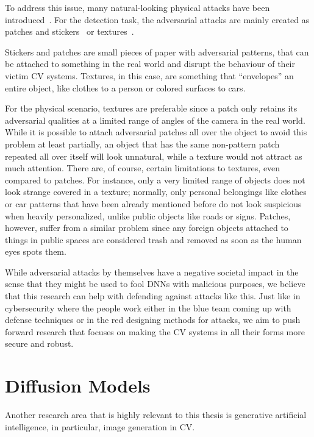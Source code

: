 To address this issue, many natural-looking physical attacks have been introduced~\cite{stop_signs_detectors_380, dog_patch_clothes, wang2021dual}.
For the detection task, the adversarial attacks are mainly created as patches and stickers~\cite{spatial_context, aerial_patch, rp2} or textures~\cite{car_camo, texture}.

Stickers and patches are small pieces of paper with adversarial patterns, that can be attached to something in the real world and disrupt the behaviour of their victim CV systems.
Textures, in this case, are something that ``envelopes'' an entire object, like clothes to a person or colored surfaces to cars.

For the physical scenario, textures are preferable since a patch only retains its adversarial qualities at a limited range of angles of the camera in the real world.
While it is possible to attach adversarial patches all over the object to avoid this problem at least partially, an object that has the same non-pattern patch repeated all over itself will look unnatural, while a texture would not attract as much attention.
There are, of course, certain limitations to textures, even compared to patches.
For instance, only a very limited range of objects does not look strange covered in a texture; normally, only personal belongings like clothes or car patterns that have been already mentioned before do not look suspicious when heavily personalized, unlike public objects like roads or signs.
Patches, however, suffer from a similar problem since any foreign objects attached to things in public spaces are considered trash and removed as soon as the human eyes spots them.

While adversarial attacks by themselves have a negative societal impact in the sense that they might be used to fool DNNs with malicious purposes, we believe that this research can help with defending against attacks like this.
Just like in cybersecurity where the people work either in the blue team coming up with defense techniques or in the red designing methods for attacks, we aim to push forward research that focuses on making the CV systems in all their forms more secure and robust.


\section{Diffusion Models}

Another research area that is highly relevant to this thesis is generative artificial intelligence, in particular, image generation in CV.

